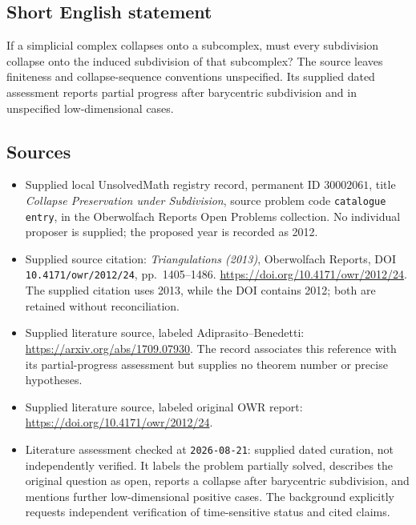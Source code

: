 \documentclass[11pt]{article}
\begin{document}
\subsection{Short English statement}
If a simplicial complex collapses onto a subcomplex, must every subdivision collapse onto the induced subdivision of that subcomplex? The source leaves finiteness and collapse-sequence conventions unspecified. Its supplied dated assessment reports partial progress after barycentric subdivision and in unspecified low-dimensional cases.
\subsection{Sources}
\begin{itemize}
\item Supplied local UnsolvedMath registry record, permanent ID \(30002061\), title \emph{Collapse Preservation under Subdivision}, source problem code \texttt{catalogue entry}, in the Oberwolfach Reports Open Problems collection. No individual proposer is supplied; the proposed year is recorded as 2012.
\item Supplied source citation: \emph{Triangulations (2013)}, Oberwolfach Reports, DOI \texttt{10.4171/owr/2012/24}, pp.~1405--1486. \url{https://doi.org/10.4171/owr/2012/24}. The supplied citation uses 2013, while the DOI contains 2012; both are retained without reconciliation.
\item Supplied literature source, labeled Adiprasito--Benedetti: \url{https://arxiv.org/abs/1709.07930}. The record associates this reference with its partial-progress assessment but supplies no theorem number or precise hypotheses.
\item Supplied literature source, labeled original OWR report: \url{https://doi.org/10.4171/owr/2012/24}.
\item Literature assessment checked at \texttt{2026-08-21}: supplied dated curation, not independently verified. It labels the problem partially solved, describes the original question as open, reports a collapse after barycentric subdivision, and mentions further low-dimensional positive cases. The background explicitly requests independent verification of time-sensitive status and cited claims.
\end{itemize}
\end{document}
